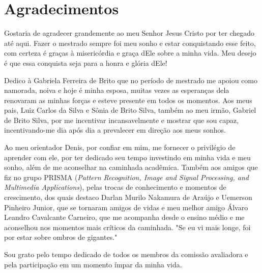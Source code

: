 \newpage
\thispagestyle{empty}
\section*{Agradecimentos}
Gostaria de agradecer grandemente ao meu Senhor Jesus Cristo por ter chegado até aqui. Fazer o mestrado sempre foi meu sonho e estar conquistando esse feito, com certeza é graças à misericórdia e graça dEle sobre a minha vida. Meu desejo é que essa conquista seja para a honra e glória dEle!

Dedico à Gabriela Ferreira de Brito que no período de mestrado me apoiou como namorada, noiva e hoje é minha esposa, muitas vezes as esperanças dela renovaram as minhas forças e esteve presente em todos os momentos. Aos meus pais, Luiz Carlos da Silva e Sônia de Brito Silva, também ao meu irmão, Gabriel de Brito Silva, por me incentivar incansavelmente e mostrar que sou capaz, incentivando-me dia após dia a prevalecer em direção aos meus sonhos.

Ao meu orientador Denis, por confiar em mim, me fornecer o privilégio de aprender com ele, por ter dedicado seu tempo investindo em minha vida e meu sonho, além de me aconselhar na caminhada acadêmica. Também aos amigos que fiz no grupo PRISMA (\textit{Pattern Recognition, Image and Signal Processing, and Multimedia Applications}), pelas trocas de conhecimento e momentos de crescimento, dos quais destaco Darlan Murilo Nakamura de Araújo e Uemerson Pinheiro Junior, que se tornaram amigos de vidas e meu melhor amigo Álvaro Leandro Cavalcante Carneiro, que me acompanha desde o ensino médio e me aconselhou nos momentos mais críticos da caminhada. "Se eu vi mais longe, foi por estar sobre ombros de gigantes."

Sou grato pelo tempo dedicado de todos os membros da comissão avaliadora e pela participação em um momento ímpar da minha vida.